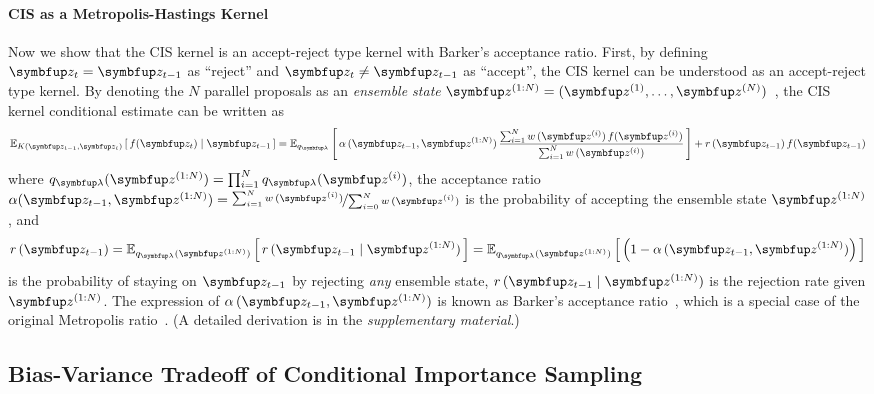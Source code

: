 \paragraph{CIS as a Metropolis-Hastings Kernel}
Now we show that the CIS kernel is an accept-reject type kernel with Barker's acceptance ratio.
First, by defining \(\vz_t = \vz_{t-1}\) as ``reject'' and \(\vz_t \neq \vz_{t-1}\) as ``accept'', the CIS kernel can be understood as an accept-reject type kernel.
By denoting the \(N\) parallel proposals as an \textit{ensemble state} \(\vz^{(1:N)} = (\vz^{(1)}, \ldots, \vz^{(N)})\)~\citep{neal_mcmc_2011a}, the CIS kernel conditional estimate can be written as
%
{%
  \begin{align}
    \Esub{K(\vz_{t-1}, \vz_t)}{f(\vz_t)\mid\vz_{t-1}}  = 
    \Esub{q_{\vlambda}}{
      \alpha\,(\vz_{t-1}, \vz^{(1:N)}) \,
      \frac{
        \sum^{N}_{i=1} w\,(\vz^{(i)})\,f(\vz^{(i)})
      }
           {
             \sum^{N}_{i=1} w\,(\vz^{(i)})
           }
    }
    + r\,(\vz_{t-1}) \, f(\vz_{t-1})\label{eq:cis_kernel}
  \end{align}
}
where \(q_{\vlambda}(\vz^{(1:N)}) = \prod^N_{i=1} q_{\vlambda}(\vz^{(i)}) \),
the acceptance ratio
\(
  \alpha(\vz_{t-1}, \vz^{(1:N)})
  = \nicefrac{\sum^{N}_{i=1} w\,(\vz^{(i)})}{\sum^{N}_{i=0} w\,(\vz^{(i)})}
\)
is the probability of accepting the ensemble state \(\vz^{(1:N)}\), and
\begin{align}
  r\,(\vz_{t-1}) = \Esub{q_{\vlambda}(\vz^{(1:N)})}{
    r\,(\vz_{t-1} \mid \vz^{(1:N)})
  }
  = \Esub{q_{\vlambda}(\vz^{(1:N)})}{
    \left(1 - \alpha\,(\vz_{t-1}, \vz^{(1:N)})\right)
  }
\end{align}
is the probability of staying on \(\vz_{t-1}\) by rejecting \textit{any} ensemble state, \(r\,(\vz_{t-1}\mid \vz^{(1:N)})\) is the rejection rate given \(\vz^{(1:N)}\).
The expression of \(\alpha\,(\vz_{t-1}, \vz^{(1:N)})\) is known as Barker's acceptance ratio~\citep{barker_monte_1965}, which is a special case of the original Metropolis ratio~\citep{metropolis_equation_1953}.
(A detailed derivation is in the \textit{supplementary material}.)


\subsection{Bias-Variance Tradeoff of Conditional Importance Sampling}\label{section:bias_variance}

